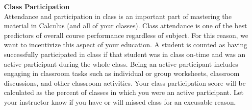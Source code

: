 \documentclass[12pt]{article}
\renewcommand{\emph}[1]{\textsf{\textbf{#1}}}
\newcommand{\localhead}[1]{\par\smallskip\textbf{#1}\nobreak\\}%
\def\heading#1{\localhead{\large\emph{#1}}}
\newenvironment{clist}%
{\bgroup\parskip 0pt\begin{list}{$\bullet$}{\partopsep 4pt\topsep 0pt\itemsep -2pt}}%
{\end{list}\egroup}%
\begin{document}
%

\heading{Class Participation}
Attendance and participation in class is an important part of mastering the material in Calculus (and all of your classes). Class attendance is one of the best predictors of overall course performance regardless of subject. For this reason, we want to incentivize this aspect of your education. A student is counted as having successfully participated in class if that student was in class on-time and was an active participant during the whole class. Being an active participant includes engaging in classroom tasks such as individual or group worksheets, classroom discussions, and other classroom activities. Your class participation score will be calculated as the percent of classes in which you were an active participant. Let your instructor know if you have {or will} missed class for an excus{able} reason.
\end{document}
